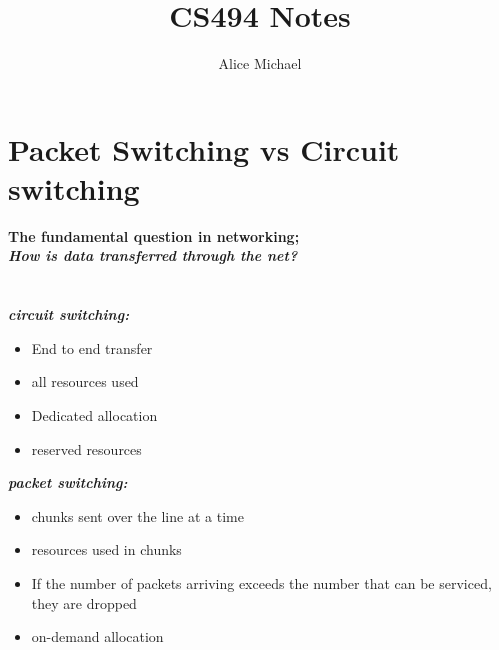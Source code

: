 \chead{}
\author{Alice Michael}
\title{CS494 Notes}
\date{}







\section*{Packet Switching vs Circuit switching}
\noindent \large{\bf{The fundamental question in networking;\\
\indent\indent \textit{How is data transferred through the net?}}}\\
 \\
 \\
\noindent\large{\bf \textit{circuit switching:}}
\begin{itemize}
  \itemsep-1.5em
  \item End to end transfer\\
  \item all resources used\\
  \item Dedicated allocation\\
  \item reserved resources\\
\end{itemize}


\noindent\large{\bf \textit{packet switching:}}
\begin{itemize}
  \itemsep-1.5em
  \item chunks sent over the line at a time\\
  \item resources used in chunks\\
  \item If the number of packets arriving exceeds the number that can be serviced, they are dropped\\
  \item on-demand allocation\\
\end{itemize}
 \\

